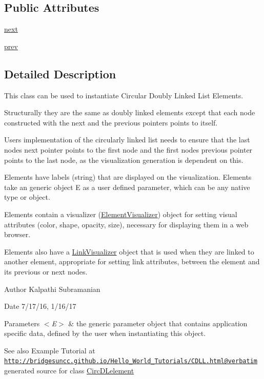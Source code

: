 \subsection*{Public Attributes}
\begin{DoxyCompactItemize}
\item 
\hyperlink{class_circ_d_lelement_1_1_circ_d_lelement_a58f067bcf3daa5c7a0e944bc91961af9}{next}
\item 
\hyperlink{class_circ_d_lelement_1_1_circ_d_lelement_a71d1419a7eb3687a3351e5ea0bcd55b4}{prev}
\end{DoxyCompactItemize}


\subsection{Detailed Description}
This class can be used to instantiate Circular Doubly Linked List Elements. 

Structurally they are the same as doubly linked elements except that each node constructed with the next and the previous pointers points to itself.

User\textquotesingle{}s implementation of the circularly linked list needs to ensure that the last node\textquotesingle{}s next pointer points to the first node and the first node\textquotesingle{}s previous pointer points to the last node, as the visualization generation is dependent on this.

Elements have labels (string) that are displayed on the visualization. Elements take an generic object E as a user defined parameter, which can be any native type or object.

Elements contain a visualizer (\hyperlink{namespace_element_visualizer}{Element\+Visualizer}) object for setting visual attributes (color, shape, opacity, size), necessary for displaying them in a web browser.

Elements also have a \hyperlink{namespace_link_visualizer}{Link\+Visualizer} object that is used when they are linked to another element, appropriate for setting link attributes, between the element and its previous or next nodes.

\begin{DoxyAuthor}{Author}
Kalpathi Subramanian
\end{DoxyAuthor}
\begin{DoxyDate}{Date}
7/17/16, 1/16/17
\end{DoxyDate}

\begin{DoxyParams}{Parameters}
{\em $<$\+E$>$} & the generic parameter object that contains application specific data, defined by the user when instantiating this object.\\
\hline
\end{DoxyParams}
\begin{DoxySeeAlso}{See also}
Example Tutorial at ~\newline
 \href{http://bridgesuncc.github.io/Hello_World_Tutorials/CDLL.html@verbatim}{\tt http\+://bridgesuncc.\+github.\+io/\+Hello\+\_\+\+World\+\_\+\+Tutorials/\+C\+D\+L\+L.\+html@verbatim} generated source for class \hyperlink{class_circ_d_lelement_1_1_circ_d_lelement}{Circ\+D\+Lelement}  
\end{DoxySeeAlso}


